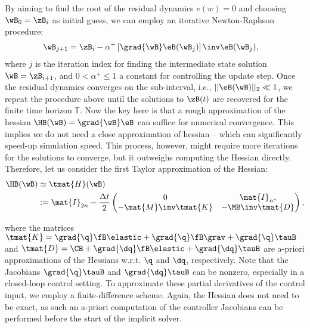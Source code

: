 %
By aiming to find the root of the residual dynamics $e(w) = 0$ and choosing $\wB_{0} = \zB_{i}$ as initial guess, we can employ an iterative Newton-Raphson procedure:
%
\begin{align}
\wB_{j+1} & = \zB_i  - \alpha^+ \left[\grad{\wB}\eB(\wB_j)\right]\inv \eB(\wB_{j}),
\end{align}
%
where $j$ is the iteration index for finding the intermediate state solution $\wB=\zB_{i+1}$, and $0 < \alpha^+ \le 1$ a constant for controlling the update step. Once the residual dynamics converges on the sub-interval, i.e., $||\eB(\wB)||_2 \ll 1$, we repeat the procedure above until the solutions to $\zB(t)$ are recovered for the finite time horizon $\mathbb{T}$. Now the key here is that a rough approximation of the hessian $\HB(\wB) = \grad{\wB} \eB$ can suffice for numerical convergence. This implies we do not need a close approximation of hessian -- which can significantly speed-up simulation speed. This process, however, might require more iterations for the solutions to converge, but it outweighs computing the Hessian directly. Therefore, let us consider the first Taylor approximation of the Hessian:
%
\begin{align}
    \HB(\wB) & \simeq \tmat{H}(\wB) \notag \\ & := \mat{I}_{2n } - \frac{\Delta t}{2} \begin{pmatrix} 0 & \mat{I}_{n},  \\
 -\mat{M} \inv \tmat{K} & -\MB\inv \tmat{D}
  \end{pmatrix},
\end{align}

\noindent where the matrices $\tmat{K} = \grad{\q}\fB\elastic + \grad{\q}\fB\grav + \grad{\q}\tauB$ and $\tmat{D} = \CB + \grad{\dq}\fB\elastic + \grad{\dq}\tauB$ are a-priori approximations of the Hessians w.r.t. $\q$ and $\dq$, respectively. Note that the Jacobians $\grad{\q}\tauB$ and $\grad{\dq}\tauB$ can be nonzero, especially in a closed-loop control setting. To approximate these partial derivatives of the control input, we employ a finite-difference scheme. Again, the Hessian does not need to be exact, as such an a-priori computation of the controller Jacobians can be performed before the start of the implicit solver.
